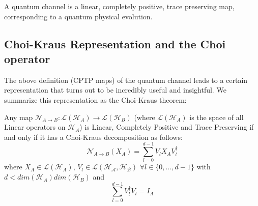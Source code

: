 \begin{definition}
    A quantum channel is a linear, completely positive, trace preserving map, corresponding to a quantum physical evolution.
\end{definition}

\subsection{Choi-Kraus Representation and the Choi operator}

The above definition (CPTP maps) of the quantum channel leads to a certain representation that turns
out to be incredibly useful and insightful. We summarize this representation as the Choi-Kraus theorem:
\begin{theorem}
    Any map $\mathcal{N}_{A\rightarrow B}:\mathcal{L}(\mathcal{H}_A) \rightarrow \mathcal{L}(\mathcal{H}_B)$
    (where $\mathcal{L}(\mathcal{H}_A)$ is the space of all Linear operators on $\mathcal{H}_A$) is Linear,
    Completely Positive and Trace Preserving if and only if it has a Choi-Kraus decomposition as follows:
    \begin{equation}
        \mathcal{N}_{A \rightarrow B}(X_A) = \displaystyle\sum_{l=0}^{d-1} V_l X_A V_l^\dagger
    \end{equation}
    where $X_A \in \mathcal{L}(\mathcal{H}_A)$, $V_l \in \mathcal{L}(\mathcal{H_A}, \mathcal{H_B})$ 
    $\forall l \in \{0,\dots,d-1\}$ with $d < dim(\mathcal{H}_A)dim(\mathcal{H}_B)$ and
    \begin{equation}
        \displaystyle\sum_{l=0}^{d-1} V_l^\dagger V_l = I_A
    \end{equation}
\end{theorem}




